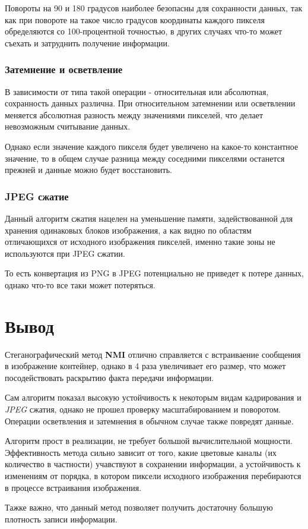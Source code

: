 \documentclass[a4paper]{article}
\begin{document}
  Повороты на 90 и 180 градусов наиболее безопасны для сохранности данных,
  так как при повороте на такое число градусов координаты каждого пикселя
  обределяются со 100-процентной точностью, в других случаях что-то может съехать
  и затруднить получение информации.

  \subsubsection{Затемнение и осветвление}

  В зависимости от типа такой операции - относительная или абсолютная, сохранность
  данных различна. При относительном затемнении или осветвлении меняется
  абсолютная разность между значениями пикселей, что делает невозможным
  считывание данных.

  Однако если значение каждого пикселя будет увеличено на какое-то константное значение,
  то в общем случае разница между соседними пикселями останется прежней и данные
  можно будет восстановить.

  \subsubsection{JPEG сжатие}

  Данный алгоритм сжатия нацелен на уменьшение памяти, задействованной
  для хранения одинаковых блоков изображения, а как видно по областям отличающихся
  от исходного изображения пикселей, именно такие зоны не используются
  при JPEG сжатии.

  То есть конвертация из PNG в JPEG потенциально не приведет к потере данных,
  однако что-то все таки может потеряться.

  \newpage
  \section{Вывод}

  Стеганографический метод \textbf{NMI} отлично справляется с встраиваение сообщения
  в изображение контейнер, однако в 4 раза увеличивает его размер, что может
  посодействовать раскрытию факта передачи информации.

  Сам алгоритм показал высокую устойчивость к некоторым видам кадрирования и
  \textit{JPEG} сжатия, однако не прошел проверку масштабированием и поворотом.
  Операции осветвления и затемнения в обычном случае также повредят данные.

  Алгоритм прост в реализации, не требует большой вычислительной мощности.
  Эффективность метода сильно зависит от того, какие цветовые каналы (их количество в частности)
  учавствуют в сохранении информации, а устойчивость к изменениям от порядка,
  в котором пиксели исходного
  изображения перебираются в процессе встраивания изображения.

  Тажке важно, что данный метод позволяет получить достаточну большую плотность
  записи информации.
\end{document}
